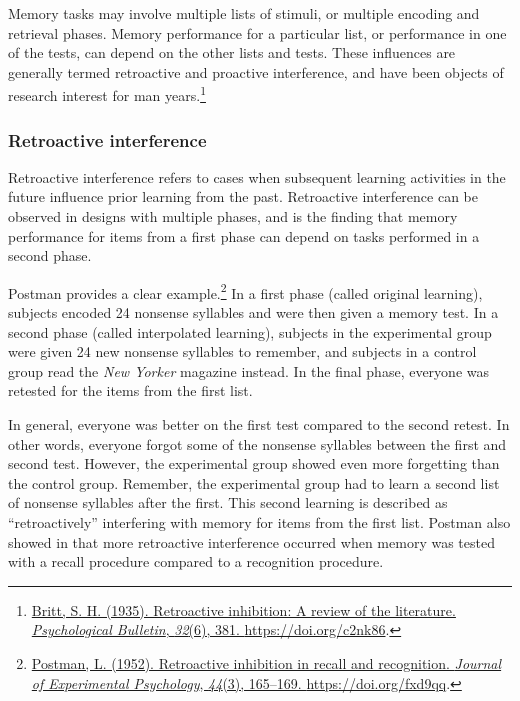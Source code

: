 \documentclass[
  oneside,
  12pt]{crumpbook}
\begin{document}
Memory tasks may involve multiple lists of stimuli, or multiple encoding and retrieval phases. Memory performance for a particular list, or performance in one of the tests, can depend on the other lists and tests. These influences are generally termed retroactive and proactive interference, and have been objects of research interest for man years.\footnote{\protect\hyperlink{ref-brittRetroactiveInhibitionReview1935}{Britt, S. H. (1935). Retroactive inhibition: A review of the literature. \emph{Psychological Bulletin}, \emph{32}(6), 381. \url{https://doi.org/c2nk86}}.}

\hypertarget{retroactive-interference}{%
\subsubsection{Retroactive interference}\label{retroactive-interference}}

Retroactive interference refers to cases when subsequent learning activities in the future influence prior learning from the past. Retroactive interference can be observed in designs with multiple phases, and is the finding that memory performance for items from a first phase can depend on tasks performed in a second phase.

Postman provides a clear example.\footnote{\protect\hyperlink{ref-postmanRetroactiveInhibitionRecall1952}{Postman, L. (1952). Retroactive inhibition in recall and recognition. \emph{Journal of Experimental Psychology}, \emph{44}(3), 165--169. \url{https://doi.org/fxd9qq}}.} In a first phase (called original learning), subjects encoded 24 nonsense syllables and were then given a memory test. In a second phase (called interpolated learning), subjects in the experimental group were given 24 new nonsense syllables to remember, and subjects in a control group read the \emph{New Yorker} magazine instead. In the final phase, everyone was retested for the items from the first list.

In general, everyone was better on the first test compared to the second retest. In other words, everyone forgot some of the nonsense syllables between the first and second test. However, the experimental group showed even more forgetting than the control group. Remember, the experimental group had to learn a second list of nonsense syllables after the first. This second learning is described as ``retroactively'' interfering with memory for items from the first list. Postman also showed in that more retroactive interference occurred when memory was tested with a recall procedure compared to a recognition procedure.
\end{document}
